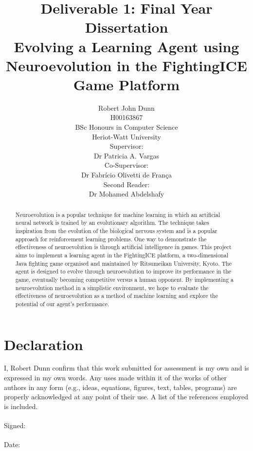 \documentclass[11pt,a4paper]{article}
\begin{document}
\title{
Deliverable 1: Final Year Dissertation\\
\vspace{10mm}
Evolving a Learning Agent using Neuroevolution in the FightingICE Game Platform\\
\vspace{25mm}
}
\date{}
\author{Robert John Dunn\\
H00163867\\
BSc Honours in Computer Science\\
Heriot-Watt University\vspace{15mm}\\
Supervisor:\\
Dr Patricia A. Vargas\vspace{3mm}\\
Co-Supervisor:\\
Dr Fabrício Olivetti de França\vspace{3mm}\\
Second Reader:\\
Dr Mohamed Abdelshafy
}
\maketitle
\newpage
\vspace*{30mm}
\section*{Declaration}
I,  Robert Dunn confirm that this work submitted for assessment is my own and is expressed
in my own words. Any uses made within it of the works of other authors in any
form (e.g., ideas, equations, figures, text, tables, programs) are properly acknowledged
at any point of their use. A list of the references employed is included.\\
\\
Signed:\\
\\
Date: 
\newpage
\begin{abstract}
Neuroevolution is a popular technique for machine learning in which an artificial neural network is trained by an evolutionary algorithm. The technique takes inspiration from the evolution of the biological nervous system and is a popular approach for reinforcement learning problems. One way to demonstrate the effectiveness of neuroevolution is through artificial intelligence in games. This project aims to implement a learning agent in the FightingICE platform, a two-dimensional Java fighting game organised and maintained by Ritsumeikan University, Kyoto. The agent is designed to evolve through neuroevolution to improve its performance in the game, eventually becoming competitive versus a human opponent. By implementing a neuroevolution method in a simplistic environment, we hope to evaluate the effectiveness of neuroevolution as a method of machine learning and explore the potential of our agent's performance.
\end{abstract}
\newpage
\tableofcontents
\newpage
\end{document}
